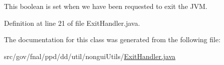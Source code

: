 This boolean is set when we have been requested to exit the J\-V\-M. 



Definition at line 21 of file Exit\-Handler.\-java.



The documentation for this class was generated from the following file\-:\begin{DoxyCompactItemize}
\item 
src/gov/fnal/ppd/dd/util/nongui\-Utils/\hyperlink{ExitHandler_8java}{Exit\-Handler.\-java}\end{DoxyCompactItemize}
